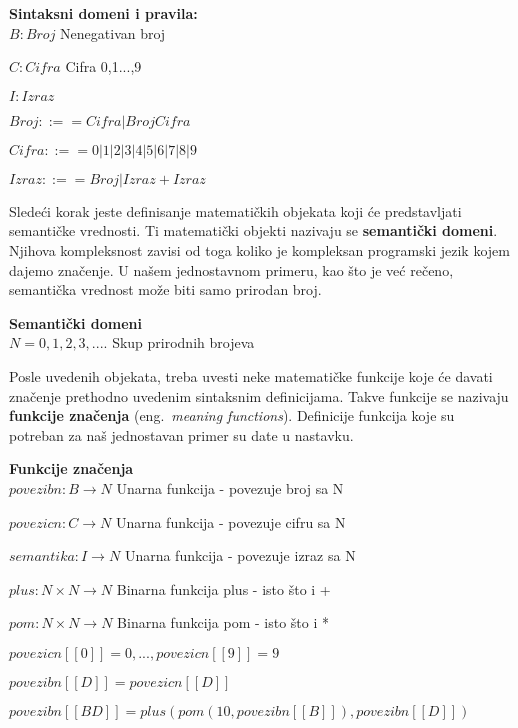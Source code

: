 \documentclass[a4paper]{article}
\begin{document}
{\begin{tcolorbox}
\textbf{Sintaksni domeni i pravila:}
\\

$B: Broj $  \qquad\qquad Nenegativan broj

$C: Cifra $ \qquad\qquad Cifra 0,1...,9

$I: Izraz $

$ Broj ::== Cifra | Broj Cifra $

$ Cifra ::== 0 | 1 | 2 | 3 | 4 | 5 | 6 | 7 | 8 | 9 $

$ Izraz ::== Broj | Izraz+Izraz $
\end{tcolorbox}

Sledeći korak jeste definisanje matematičkih objekata koji će predstavljati semantičke vrednosti.  Ti matematički objekti nazivaju se \textbf{semantički domeni}. Njihova kompleksnost zavisi od toga koliko je kompleksan programski jezik kojem dajemo značenje. U našem jednostavnom primeru, kao što je već rečeno, semantička vrednost može biti samo prirodan broj. 
\begin{tcolorbox}
\textbf{Semantički domeni}
\\

$N={0,1,2,3,....} $  \qquad\qquad Skup prirodnih brojeva

\end{tcolorbox}
Posle uvedenih objekata, treba uvesti neke matematičke funkcije koje će davati značenje prethodno uvedenim sintaksnim definicijama. Takve funkcije se nazivaju \textbf{funkcije značenja }(eng.~{\em meaning functions}). Definicije funkcija koje su potreban za naš jednostavan primer su date u nastavku.
\begin{tcolorbox}
\textbf{Funkcije značenja}
\\

$povezibn: B \rightarrow N $  \qquad Unarna funkcija - povezuje broj sa N

$povezicn: C \rightarrow N $  \qquad Unarna funkcija - povezuje cifru sa N

$semantika: I \rightarrow N $   \qquad Unarna funkcija - povezuje izraz sa N

$plus: N \times N \rightarrow N $  \qquad Binarna funkcija plus - isto što i + 

$pom: N \times N \rightarrow N $ \qquad Binarna funkcija pom - isto što i *

$ povezicn[[0]] = 0,... ,povezicn[[9]] = 9 $

$ povezibn[[D]] = povezicn[[D]] $

$ povezibn[[B D]] = plus(pom(10, povezibn[[B]]),povezibn[[D]]) $


\end{tcolorbox}}
\end{document}
